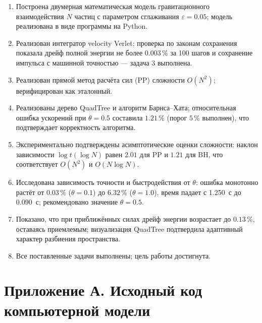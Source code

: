 \documentclass[12pt,a4paper]{article}
\begin{document}
	\begin{enumerate}
		\item Построена двумерная математическая модель гравитационного взаимодействия $N$ частиц с параметром сглаживания $\varepsilon = 0.05$; модель реализована в виде программы на Python.
		\item Реализован интегратор velocity Verlet; проверка по законам сохранения показала дрейф полной энергии не более $0.003\,\%$ за 100 шагов и сохранение импульса с машинной точностью --- задача 3 выполнена.
		\item Реализован прямой метод расчёта сил (PP) сложности $O(N^2)$; верифицирован как эталонный.
		\item Реализованы дерево QuadTree и алгоритм Барнса--Хата; относительная ошибка ускорений при $\theta = 0.5$ составила $1.21\,\%$ (порог $5\,\%$ выполнен), что подтверждает корректность алгоритма.
		\item Экспериментально подтверждены асимптотические оценки сложности: наклон зависимости $\log t(\log N)$ равен $2.01$ для PP и $1.21$ для BH, что соответствует $O(N^2)$ и $O(N\log N)$.
		\item Исследована зависимость точности и быстродействия от $\theta$: ошибка монотонно растёт от $0.03\,\%$ ($\theta=0.1$) до $6.32\,\%$ ($\theta=1.0$), время падает с 1.250~с до 0.090~с; рекомендовано значение $\theta = 0.5$.
		\item Показано, что при приближённых силах дрейф энергии возрастает до $0.13\,\%$, оставаясь приемлемым; визуализация QuadTree подтвердила адаптивный характер разбиения пространства.
		\item Все поставленные задачи выполнены; цель работы достигнута.
	\end{enumerate}
	
	\newpage
	\section*{Приложение А. Исходный код компьютерной модели}
	
\end{document}
